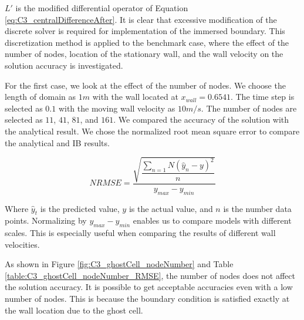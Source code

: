 $L'$ is the modified differential operator of Equation \eqref{eq:C3_centralDifferenceAfter}. It is clear that excessive modification of the discrete solver is required for implementation of the immersed boundary. This discretization method is applied to the benchmark case, where the effect of the number of nodes, location of the stationary wall, and the wall velocity on the solution accuracy is investigated.

For the first case, we look at the effect of the number of nodes. We choose the length of domain as $1m$ with the wall located at $x_{wall} = 0.6541$. The time step is selected as $0.1$ with the moving wall velocity as $10 m/s$. The number of nodes are selected as $11$, $41$, $81$, and $161$. We compared the accuracy of the solution with the analytical result. We chose the normalized root mean square error to compare the analytical and IB results.

\begin{equation*}
    NRMSE = \dfrac{\sqrt{\dfrac{\sum_{n=1}{N} \left( \hat{y}_n - y \right)^2}{n}}}{y_{max} - y_{min}}
\end{equation*}

Where $\hat{y}_t$ is the predicted value, $y$ is the actual value, and $n$ is the number data points. Normalizing by $y_{max} - y_{min}$ enables us to compare models with different scales. This is especially useful when comparing the results of different wall velocities.

As shown in Figure \ref{fig:C3_ghostCell_nodeNumber} and Table \ref{table:C3_ghostCell_nodeNumber_RMSE}, the number of nodes does not affect the solution accuracy. It is possible to get acceptable accuracies even with a low number of nodes. This is because the boundary condition is satisfied exactly at the wall location due to the ghost cell.

